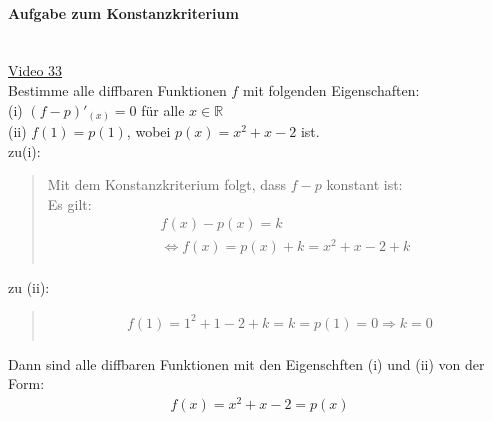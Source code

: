 \paragraph{Aufgabe zum Konstanzkriterium}$  $\vspace*{3mm}\\
\href{https://youtu.be/mMXOmLVoRmo}{Video 33}\\
Bestimme alle diffbaren Funktionen $ f $ mit folgenden Eigenschaften:\\
(i)\; $ (f-p)'_{(x)}=0 $ für alle $ x\in \mathbb{R} $\\
(ii) $f(1)=p(1)$,
wobei $ p(x)=x^2+x-2 $ ist.\\
zu(i):\\
\begin{quote}
	Mit dem Konstanzkriterium folgt, dass $ f-p $ konstant ist:\\
	Es gilt:\\
	\begin{align*}
	&f(x)-p(x)=k\\
	&\Leftrightarrow f(x)=p(x)+k=x^2+x-2+k\\
	\end{align*}
\end{quote}
zu (ii):\\
\begin{quote}
	\begin{align*}
	f(1)=1^2+1-2+k=k=p(1)=0\Rightarrow k=0\\
	\end{align*}
\end{quote}
Dann sind alle diffbaren Funktionen mit den Eigenschften (i) und (ii) von der Form:\\
\begin{align*}
f(x)=x^2+x-2=p(x)\\
\end{align*}
